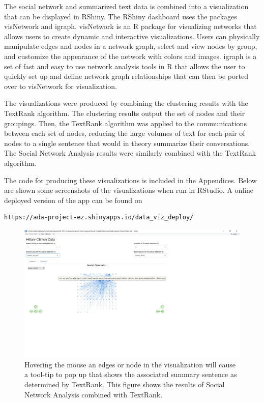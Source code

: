 The social network and summarized text data is combined into a visualization that can be displayed in RShiny. The RShiny dashboard uses the packages visNetwork and igraph. visNetwork is an R package for visualizing networks that allows users to create dynamic and interactive visualizations. Users can physically manipulate edges and nodes in a network graph, select and view nodes by group, and customize the appearance of the network with colors and images. igraph is a set of fast and easy to use network analysis tools in R that allows the user to quickly set up and define network graph relationships that can then be ported over to visNetwork for visualization.

The visualizations were produced by combining the clustering results with the TextRank algorithm.
The clustering results output the set of nodes and their groupings. Then, the TextRank algorithm was applied to the communications between each set of nodes, reducing the large volumes of text for each pair of nodes to a single sentence that would in theory summarize their conversations. The Social Network Analysis results were similarly combined with the TextRank algorithm.

The code for producing these visualizations is included in the Appendices. Below are shown some screenshots of the visualizations when run in RStudio. A online deployed version of the app can be found on \begin{verbatim}https://ada-project-ez.shinyapps.io/data_viz_deploy/\end{verbatim}

\begin{figure}[h]
	\includegraphics[width=\textwidth]{eric/Viz_Screenshot_1}
	\caption{Hovering the mouse an edges or node in the visualization will cause a tool-tip to pop up that shows the associated summary sentence as determined by TextRank. This figure shows the results of Social Network Analysis combined with TextRank.}
	\label{Viz1}
\end{figure}


